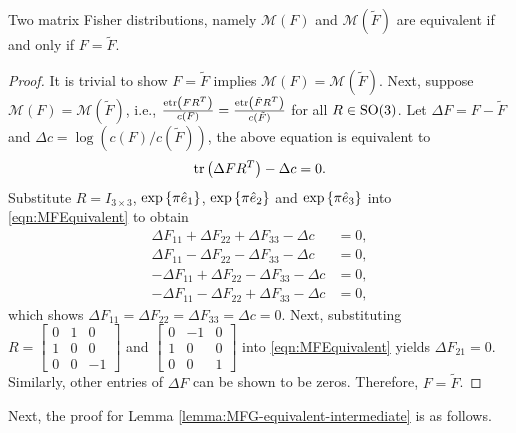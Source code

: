 \begin{lemma} \label{lemma:MF-equivalent}
	Two matrix Fisher distributions, namely $\mathcal{M}(F)$ and $\mathcal{M}(\tilde F)$ are equivalent if and only if $F=\tilde{F}$.
\end{lemma}
\begin{proof}
	It is trivial to show $F = \tilde F$ implies $\mathcal{M}(F)=\mathcal{M}(\tilde F)$.
	Next, suppose $\mathcal{M}(F)=\mathcal{M}(\tilde F)$, i.e.,  $\frac{\mathrm{etr}\left( FR^T \right)}{c(F)} = \frac{\mathrm{etr}\left( \tilde{F}R^T \right)}{c(\tilde{F})}$ for all $R\in\mathrm{SO}(3)$.
	Let $\Delta F = F-\tilde{F}$ and $\Delta c = \log(c(F)/c(\tilde{F}))$, the above equation is equivalent to
	\begin{equation} \label{eqn:MFEquivalent}
		\mathrm{tr}\left( \Delta FR^T \right) - \Delta c = 0.  
	\end{equation}
	Substitute $R = I_{3\times3}$, $\exp\left\{ \pi\hat{e}_1 \right\}$, $\exp\left\{ \pi\hat{e}_2 \right\}$ and $\exp\left\{ \pi\hat{e}_3 \right\}$ into \eqref{eqn:MFEquivalent} to obtain
	\begin{align*}
		\Delta F_{11} + \Delta F_{22} + \Delta F_{33} - \Delta c &= 0, \\
		\Delta F_{11} - \Delta F_{22} - \Delta F_{33} - \Delta c &= 0, \\
		-\Delta F_{11} + \Delta F_{22} - \Delta F_{33} - \Delta c &= 0, \\
		-\Delta F_{11} - \Delta F_{22} + \Delta F_{33} - \Delta c &= 0,
	\end{align*}
	which shows $\Delta F_{11} = \Delta F_{22} = \Delta F_{33} = \Delta c = 0$.
	Next, substituting $R = \begin{bmatrix} 0 & 1 & 0 \\ 1 & 0 & 0 \\ 0 & 0 & -1 \end{bmatrix}$ and $\begin{bmatrix} 0 & -1 & 0 \\ 1 & 0 & 0 \\ 0 & 0 & 1 \end{bmatrix}$ into \eqref{eqn:MFEquivalent} yields $\Delta F_{21} = 0$.
	Similarly, other entries of $\Delta F$ can be shown to be zeros. 
	Therefore, $F=\tilde{F}$.
\end{proof}

Next, the proof for Lemma \ref{lemma:MFG-equivalent-intermediate} is as follows.

